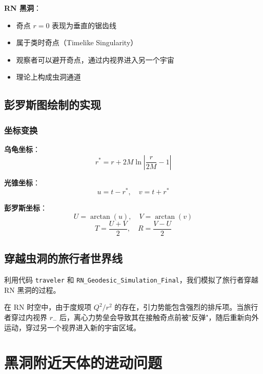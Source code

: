 \documentclass[a4paper,12pt]{article}
\begin{document}
\textbf{RN 黑洞}：
\begin{itemize}
    \item 奇点 $r=0$ 表现为垂直的锯齿线
    \item 属于类时奇点（Timelike Singularity）
    \item 观察者可以避开奇点，通过内视界进入另一个宇宙
    \item 理论上构成虫洞通道
\end{itemize}

\subsection{彭罗斯图绘制的实现}

\subsubsection{坐标变换}

\textbf{乌龟坐标}：
\begin{equation}
    r^* = r + 2M\ln\left|\frac{r}{2M}-1\right|
\end{equation}

\textbf{光锥坐标}：
\begin{equation}
    u = t - r^*, \quad v = t + r^*
\end{equation}

\textbf{彭罗斯坐标}：
\begin{equation}
    U = \arctan(u), \quad V = \arctan(v)
\end{equation}
\begin{equation}
    T = \frac{U+V}{2}, \quad R = \frac{V-U}{2}
\end{equation}

\subsection{穿越虫洞的旅行者世界线}

利用代码 \texttt{traveler} 和 \texttt{RN\_Geodesic\_Simulation\_Final}，我们模拟了旅行者穿越 RN 黑洞的过程。

在 RN 时空中，由于度规项 $Q^2/r^2$ 的存在，引力势能包含强烈的排斥项。当旅行者穿过内视界 $r_-$ 后，离心力势垒会导致其在接触奇点前被"反弹"，随后重新向外运动，穿过另一个视界进入新的宇宙区域。

\section{黑洞附近天体的进动问题}
\end{document}
